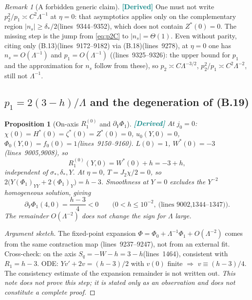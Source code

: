 \documentclass[11pt,a4paper]{article}
\newtheorem{proposition}[theorem]{Proposition}
\theoremstyle{definition}
\theoremstyle{remark}
\newtheorem{remark}[theorem]{Remark}
\newcommand{\lnos}[1]{(lines~#1)}
\newcommand{\DER}{\textcolor{teal}{\textbf{[Derived]}}}
\newcommand{\notproved}{\emph{This note does not prove this step; it is stated only as an observation
and does not constitute a complete proof.}}
\begin{document}
\begin{remark}[A forbidden generic claim]
\DER
One must not write $p_2^2/p_1\asymp C^2\Lambda^{-1}$ at $\eta=0$:
that asymptotics applies only on the complementary region $|n_s|\ge\delta_*/2$\lnos{9344--9352},
which does not contain $Z^*(0)=0$. The missing step is the jump from \eqref{eq:p2C} to
$|n_s|=\Theta(1)$.
Even without parity, citing only (B.13)\lnos{9172--9182} via (B.18)\lnos{9278},
at $\eta=0$ one has $n_s=O(\Lambda^{-1})$ and $p_1=O(\Lambda^{-1})$
(\lnos{9325--9326}: the upper bound for $p_1$ and the approximation for $n_s$ follow from these), so
$p_2\asymp C\Lambda^{-3/2}$, $p_2^2/p_1\asymp C^2\Lambda^{-2}$, still not $\Lambda^{-1}$.
\end{remark}

\subsection{\texorpdfstring{$p_1=2(3-h)/\Lambda$}{p\_1=2(3-h)/Lambda} and the degeneration of (B.19)}
\label{sec:note3-p1}

\begin{proposition}[On-axis $R_1^{(0)}$ and $\partial_Y\Phi_1$]
\label{prop:Phi1}
\DER
At $j_0=0$: $\chi(0)=H^*(0)=\zeta^*(0)=Z^*(0)=0$, $u_0(Y,0)=0$,
$\Phi_0(Y,0)=f_0(0)=1$\lnos{9150--9160}.
$L(0)=1$, $W^*(0)=-3$\lnos{9005,9008}, so
\begin{equation}
\label{eq:R10}
R_1^{(0)}(Y,0)=W^*(0)+h=-3+h,
\end{equation}
independent of $\sigma_*,\delta_*,Y$.
At $\eta=0$, $T=J_2\chi/2=0$, so
$2\bigl(Y(\Phi_1)_{YY}+2(\Phi_1)_Y\bigr)=h-3$.
Smoothness at $Y=0$ excludes the $Y^{-2}$ homogeneous solution, giving
\begin{equation}
\label{eq:Phi1Y}
\partial_Y\Phi_1(4,0)=\frac{h-3}{4}<0
\qquad\bigl(0<h\le 10^{-2},\ \text{\lnos{9002,1344--1347}}\bigr).
\end{equation}
The remainder $O(\Lambda^{-2})$ does not change the sign for $\Lambda$ large.
\end{proposition}

\begin{proof}[Argument sketch]
The fixed-point expansion $\Phi=\Phi_0+\Lambda^{-1}\Phi_1+O(\Lambda^{-2})$ comes from the same
contraction map \lnos{9237--9247}, not from an external fit.
Cross-check: on the axis $S_q=-W-h=3-h$\lnos{1464}, consistent with $R_1=h-3$.
ODE: $Yv'+2v=(h-3)/2$ with $v(0)$ finite $\Rightarrow$ $v\equiv(h-3)/4$.
The consistency estimate of the expansion remainder is not written out.
\notproved
\end{proof}
\end{document}
